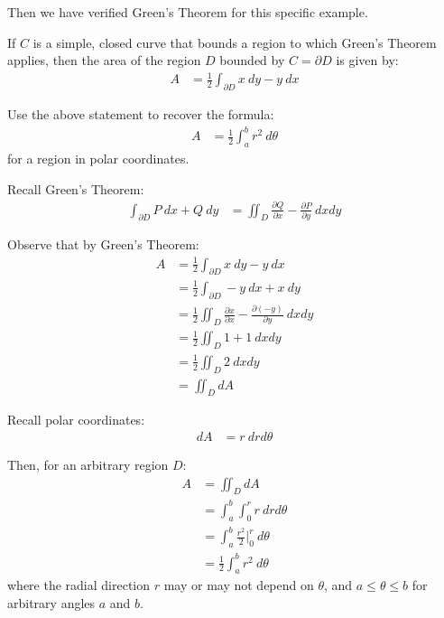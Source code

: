 \begin{solution}
    Then we have verified Green's Theorem for this specific example.
\end{solution}

\begin{tcolorbox}[
        title={Problem 24},
        valign=center,
        nobeforeafter,
        colframe=gray!95!black
    ]
    If \(C\) is a simple, closed curve that bounds a region to which Green’s Theorem applies, then the area of the region \(D\) bounded by \(C = \partial D \) is given by:
    \begin{align}
        A &= \frac{1}{2} \int_{\partial D} x \ dy - y \ dx
    \end{align}
    
    Use the above statement to recover the formula:
    \begin{align}
        A &= \frac{1}{2} \int_a^b r^2 \ d\theta
    \end{align}
    for a region in polar coordinates.
\end{tcolorbox}

\begin{solution}
    Recall Green's Theorem:
    \begin{align}
        \int_{\partial D} P \ dx + Q \ dy &= \iint_D \frac{\partial Q}{\partial x} - \frac{\partial P}{\partial y} \ dxdy
    \end{align}
    
    Observe that by Green's Theorem:
    \begin{align*}
        A &= \frac{1}{2} \int_{\partial D} x \ dy - y \ dx \\
        &= \frac{1}{2} \int_{\partial D} - y \ dx + x \ dy \\
        &= \frac{1}{2} \iint_{D} \frac{\partial x}{\partial x} - \frac{\partial (-y)}{\partial y} \ dxdy \\
        &= \frac{1}{2} \iint_{D} 1 + 1 \ dxdy \\
        &= \frac{1}{2} \iint_{D} 2 \ dxdy \\
        &= \iint_{D} dA
    \end{align*}

    Recall polar coordinates:
    \begin{align}
        dA &= r \ dr d\theta
    \end{align}

    Then, for an arbitrary region \(D\):
    \begin{align*}
        A &= \iint_{D} dA \\
        &= \int_{a}^{b} \int_0^r r \ dr d\theta \\
        &= \int_{a}^{b} \frac{r^2}{2} \Biggr|_0^r \ d\theta \\
        &= \frac{1}{2} \int_{a}^{b} r^2 \ d\theta
    \end{align*}
    where the radial direction \(r\) may or may not depend on \(\theta\), and \(a \leq \theta \leq b\) for arbitrary angles \(a\) and \(b\).
\end{solution}

